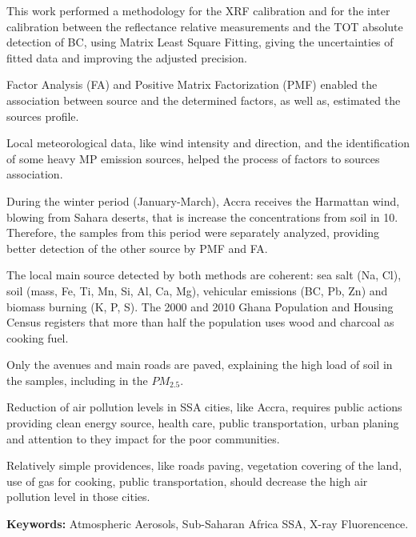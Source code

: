 This work performed a methodology for the XRF calibration and for 
the inter calibration between the reflectance relative measurements 
and the TOT absolute detection of BC, 
using Matrix Least Square Fitting, giving the uncertainties of 
fitted data and improving the adjusted precision.


Factor Analysis (FA) and Positive Matrix Factorization (PMF) 
enabled the association between source and the determined factors, 
as well as, estimated the sources profile. 

Local meteorological data, like wind intensity and direction, 
and the identification of some heavy MP emission sources, 
helped the process of factors to sources association. 

During the winter period (January-March), Accra receives the 
Harmattan wind, blowing from Sahara deserts, that is increase
the concentrations from soil in 10. Therefore, the samples from 
this period were separately analyzed, providing better detection 
of the other source by PMF and FA.

The local main source detected by both methods are coherent: 
sea salt (Na, Cl), soil (mass, Fe, Ti, Mn, Si, Al, Ca, Mg), 
vehicular emissions (BC, Pb, Zn) and biomass burning (K, P, S). 
The 2000 and 2010 Ghana Population and Housing Census registers 
that more than half the population uses wood and charcoal as cooking fuel. 

Only the avenues and main roads are paved, explaining the high 
load of soil in the samples, including in the $PM_{2.5}$.

Reduction of air pollution levels in SSA cities, like Accra, 
requires public actions providing clean energy source, health care, 
public transportation, urban planing and attention to they impact for 
the poor communities. 

Relatively simple providences, like roads paving, vegetation 
covering of the land, use of gas for cooking, public transportation, 
should decrease the high air pollution level in those cities.

\par
\vspace{1em}
\noindent\textbf{Keywords:} Atmospheric Aerosols, Sub-Saharan Africa SSA,
X-ray Fluorencence.

